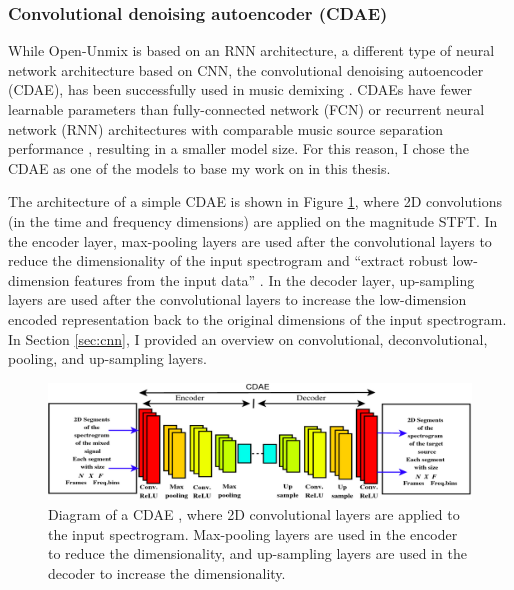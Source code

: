 \documentclass[report.tex]{subfiles}
\begin{document}
\subsubsection{Convolutional denoising autoencoder (CDAE)}
\label{sec:cdae}

While Open-Unmix is based on an RNN architecture, a different type of neural network architecture based on CNN, the convolutional denoising autoencoder (CDAE), has been successfully used in music demixing \parencite{plumbley1, plumbley2}. CDAEs have fewer learnable parameters than fully-connected network (FCN) or recurrent neural network (RNN) architectures with comparable music source separation performance \parencite{plumbley1}, resulting in a smaller model size. For this reason, I chose the CDAE as one of the models to base my work on in this thesis.

The architecture of a simple CDAE is shown in Figure \ref{fig:cdaes}, where 2D convolutions (in the time and frequency dimensions) are applied on the magnitude STFT. In the encoder layer, max-pooling layers are used after the convolutional layers to reduce the dimensionality of the input spectrogram and ``extract robust low-dimension features from the input data'' \parencite[1]{plumbley1}. In the decoder layer, up-sampling layers are used after the convolutional layers to increase the low-dimension encoded representation back to the original dimensions of the input spectrogram. In Section \ref{sec:cnn}, I provided an overview on convolutional, deconvolutional, pooling, and up-sampling layers.

\begin{figure}[ht]
	\centering
	\includegraphics[width=\textwidth]{./images-neural/cdae_1.png}
	\caption{Diagram of a CDAE {\parencite[2]{plumbley1}}, where 2D convolutional layers are applied to the input spectrogram. Max-pooling layers are used in the encoder to reduce the dimensionality, and up-sampling layers are used in the decoder to increase the dimensionality.}
	\label{fig:cdaes}
\end{figure}
\end{document}
